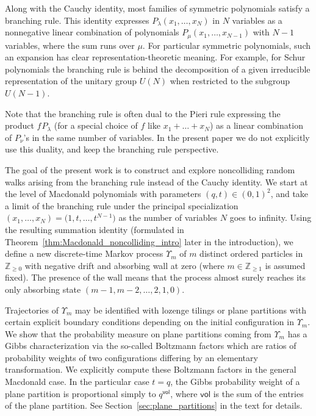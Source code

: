 \documentclass[pdftex]{sigma}
\numberwithin{equation}{section}
\begin{document}
Along with the Cauchy identity,
most families of symmetric polynomials
satisfy a branching rule.
This identity
expresses $P_\lambda(x_1,\dots,x_N )$
in $N$ variables as a nonnegative linear combination
of polynomials $P_\mu(x_1,\dots,x_{N-1} )$
with $N-1$ variables, where the sum runs over $\mu$.
For particular symmetric polynomials, such an expansion has clear
representation-theoretic meaning.
For example,
for Schur polynomials the branching rule
is behind the decomposition of a given irreducible representation
of the unitary group $U(N)$
when restricted to the subgroup $U(N-1)$.

Note that the branching rule is often dual to the Pieri rule
expressing the product $f\hspace{1pt} P_\lambda$ (for a special choice of $f$
like $x_1+\dots+x_N$)
as a linear combination of $P_\nu$'s in the same number of variables.
In the present paper we do not explicitly use this duality,
and keep the branching rule perspective.

The goal of the present work is to
construct and
explore noncolliding random walks arising
from the branching rule instead of the Cauchy identity.
We start at the level of Macdonald polynomials
with parameters $(q,t)\in(0,1)^2$, and
take a limit
of the branching rule under the principal specialization
$(x_1,\dots,x_N )=\big(1,t,\dots,t^{N-1} \big)$
as the number of variables $N$ goes to infinity.
\mbox{Using} the resulting summation identity
(formulated in Theorem~\ref{thm:Macdonald_noncolliding_intro}
later in the introduction),
we define a
new
discrete-time Markov process $\Upsilon_m$ of $m$ distinct ordered
particles in $\mathbb{Z}_{\ge0}$
with negative drift and absorbing wall
at zero (where $m\in \mathbb{Z}_{\ge1}$
is assumed fixed).
The presence of the wall means that the process
almost surely
reaches its only absorbing state $(m-1,m-2,\dots,2,1,0 )$.

Trajectories of $\Upsilon_m$ may be identified with
lozenge tilings or plane partitions with certain
explicit boundary conditions depending on
the initial configuration in
$\Upsilon_m$.
We show that the probability measure on plane partitions coming from
$\Upsilon_m$ has a Gibbs characterization via the so-called
Boltzmann factors
which are ratios of
probability weights of two configurations
differing by an elementary transformation.
We explicitly compute these Boltzmann factors
in the general Macdonald case.
In the particular case $t=q$,
the Gibbs probability weight
of a plane partition is proportional simply to
$q^{\mathsf{vol}}$, where $\mathsf{vol}$ is the sum of the
entries of the plane partition.
See Section~\ref{sec:plane_partitions} in the text for details.
\end{document}

